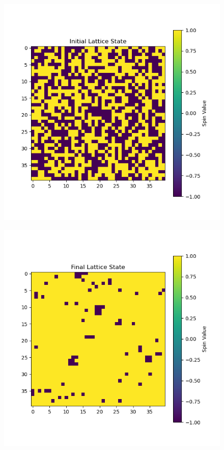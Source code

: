 \documentclass[12pt]{article}
\begin{document}
\begin{figure}
  \centering
  \includegraphics[max width=\textwidth]{lattice_state_0_1.png}
\end{figure}
\begin{figure}
  \centering
  \includegraphics[max width=\textwidth]{lattice_state_999_1.png}
\end{figure}
\newpage
\end{document}
